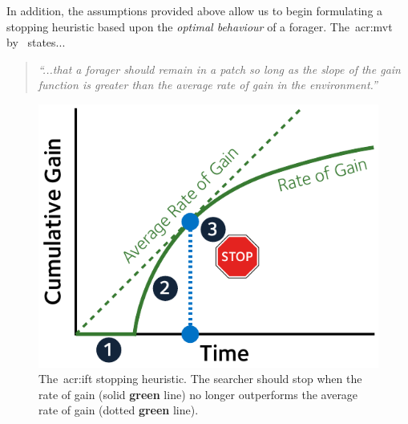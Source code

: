In addition, the assumptions provided above allow us to begin formulating a stopping heuristic based upon the \emph{optimal behaviour} of a forager. The~\gls{acr:mvt} by~\cite{charnov1976mvt} states...

\begin{quote}
    \emph{``...that a forager should remain in a patch so long as the slope of the gain function is greater than the average rate of gain in the environment.''}
\end{quote}

\begin{figure}
    \begin{center}
    \vspace*{-7mm}
    \includegraphics[width=1\textwidth]{figures/ch3-ift_stop.pdf}
    \end{center}
    \vspace*{-4mm}
    \caption[Optimal \gls{acr:ift} stopping heuristic]{The~\gls{acr:ift} stopping heuristic. The searcher should stop when the rate of gain (solid \textbf{\color{dmax_green}green} line) no longer outperforms the average rate of gain (dotted \textbf{\color{dmax_green}green} line).}
    \label{fig:ift_stopping}
\end{figure}

